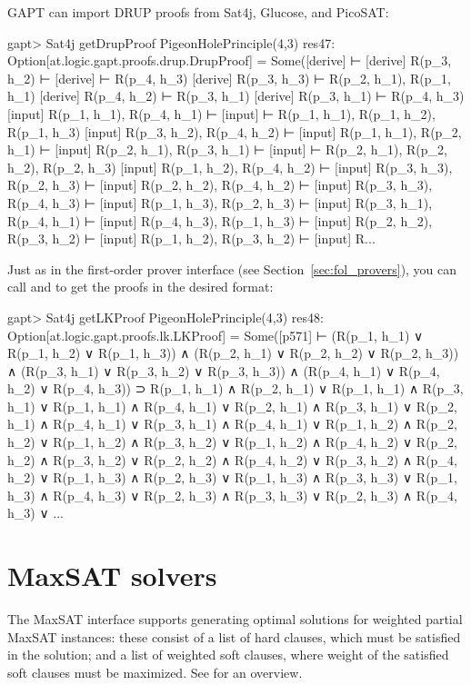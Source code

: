 \documentclass[a4paper,11pt]{book}
\newcommand{\cli}[1]{{\ttfamily {#1}}}
\begin{document}
GAPT can import DRUP proofs from Sat4j, Glucose, and PicoSAT:
\begin{clilisting}
gapt> Sat4j getDrupProof PigeonHolePrinciple(4,3)
res47: Option[at.logic.gapt.proofs.drup.DrupProof] =
Some([derive]  ⊢
[derive] R(p_3, h_2) ⊢
[derive]  ⊢ R(p_4, h_3)
[derive] R(p_3, h_3) ⊢ R(p_2, h_1), R(p_1, h_1)
[derive] R(p_4, h_2) ⊢ R(p_3, h_1)
[derive] R(p_3, h_1) ⊢ R(p_4, h_3)
[input] R(p_1, h_1), R(p_4, h_1) ⊢
[input]  ⊢ R(p_1, h_1), R(p_1, h_2), R(p_1, h_3)
[input] R(p_3, h_2), R(p_4, h_2) ⊢
[input] R(p_1, h_1), R(p_2, h_1) ⊢
[input] R(p_2, h_1), R(p_3, h_1) ⊢
[input]  ⊢ R(p_2, h_1), R(p_2, h_2), R(p_2, h_3)
[input] R(p_1, h_2), R(p_4, h_2) ⊢
[input] R(p_3, h_3), R(p_2, h_3) ⊢
[input] R(p_2, h_2), R(p_4, h_2) ⊢
[input] R(p_3, h_3), R(p_4, h_3) ⊢
[input] R(p_1, h_3), R(p_2, h_3) ⊢
[input] R(p_3, h_1), R(p_4, h_1) ⊢
[input] R(p_4, h_3), R(p_1, h_3) ⊢
[input] R(p_2, h_2), R(p_3, h_2) ⊢
[input] R(p_1, h_2), R(p_3, h_2) ⊢
[input] R...

\end{clilisting}

Just as in the first-order prover interface (see Section~\ref{sec:fol_provers}), you can call
\cli{getResolutionProof} and \cli{getLKProof} to get the proofs in the desired
format:
\begin{clilisting}
gapt> Sat4j getLKProof PigeonHolePrinciple(4,3)
res48: Option[at.logic.gapt.proofs.lk.LKProof] =
Some([p571]
⊢
(R(p_1, h_1) ∨ R(p_1, h_2) ∨ R(p_1, h_3)) ∧
    (R(p_2, h_1) ∨ R(p_2, h_2) ∨ R(p_2, h_3)) ∧
    (R(p_3, h_1) ∨ R(p_3, h_2) ∨ R(p_3, h_3)) ∧
    (R(p_4, h_1) ∨ R(p_4, h_2) ∨ R(p_4, h_3)) ⊃
  R(p_1, h_1) ∧ R(p_2, h_1) ∨
    R(p_1, h_1) ∧ R(p_3, h_1) ∨
    R(p_1, h_1) ∧ R(p_4, h_1) ∨
    R(p_2, h_1) ∧ R(p_3, h_1) ∨
    R(p_2, h_1) ∧ R(p_4, h_1) ∨
    R(p_3, h_1) ∧ R(p_4, h_1) ∨
    R(p_1, h_2) ∧ R(p_2, h_2) ∨
    R(p_1, h_2) ∧ R(p_3, h_2) ∨
    R(p_1, h_2) ∧ R(p_4, h_2) ∨
    R(p_2, h_2) ∧ R(p_3, h_2) ∨
    R(p_2, h_2) ∧ R(p_4, h_2) ∨
    R(p_3, h_2) ∧ R(p_4, h_2) ∨
    R(p_1, h_3) ∧ R(p_2, h_3) ∨
    R(p_1, h_3) ∧ R(p_3, h_3) ∨
    R(p_1, h_3) ∧ R(p_4, h_3) ∨
    R(p_2, h_3) ∧ R(p_3, h_3) ∨
    R(p_2, h_3) ∧ R(p_4, h_3) ∨
    ...

\end{clilisting}

\section{MaxSAT solvers}

The MaxSAT interface supports generating optimal solutions for weighted partial
MaxSAT instances: these consist of a list of hard clauses, which must be
satisfied in the solution; and a list of weighted soft clauses, where weight of
the satisfied soft clauses must be maximized.  See \cite{Argelich2008First}
for an overview.
\end{document}
